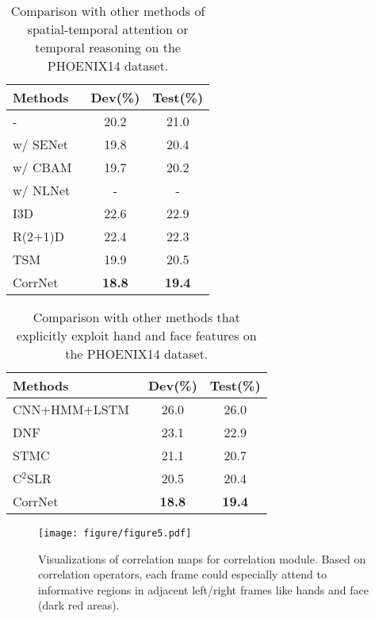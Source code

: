 \documentclass[10pt,twocolumn,letterpaper]{article}
\begin{document}
  \begin{table}[t]   
  \centering
  \setlength\tabcolsep{3pt}
  \begin{tabular}{lcc}
  \hline
  Methods & Dev(\%) & Test(\%)\\
  \hline
  - & 20.2 & 21.0\\
  w/ SENet~\cite{hu2018squeeze}  & 19.8  & 20.4 \\
  w/ CBAM~\cite{woo2018cbam} & 19.7 & 20.2 \\
  w/ NLNet~\cite{wang2018non} & - & -\\
  \hline
  I3D~\cite{carreira2017quo} & 22.6  & 22.9 \\
  R(2+1)D~\cite{tran2018closer}  & 22.4  & 22.3 \\
  TSM~\cite{lin2019tsm} & 19.9 & 20.5 \\
  \hline
  CorrNet & \textbf{18.8} & \textbf{19.4} \\
  \hline
  \end{tabular}
  \caption{Comparison with other methods of spatial-temporal attention or temporal reasoning on the PHOENIX14 dataset.} 
  \label{tab6} 
  \end{table}

\begin{table}[t]   
  \centering
  \setlength\tabcolsep{3pt}
  \begin{tabular}{lcc}
  \hline
  Methods & Dev(\%) & Test(\%)\\
  \hline
  CNN+HMM+LSTM~\cite{koller2019weakly} & 26.0  & 26.0 \\
  DNF~\cite{cui2019deep} & 23.1 & 22.9\\
  STMC~\cite{zhou2020spatial} & 21.1  & 20.7 \\
  C$^2$SLR~\cite{zuo2022c2slr} & 20.5  & 20.4 \\
  \hline
  CorrNet & \textbf{18.8} & \textbf{19.4} \\
  \hline
  \end{tabular}
  \caption{Comparison with other methods that explicitly exploit hand and face features on the PHOENIX14 dataset.} 
  \label{tab7} 
  \end{table}

\begin{figure*}[t]
  \centering
  \texttt{[image: figure/figure5.pdf]}
  \caption{Visualizations of correlation maps for correlation module. Based on correlation operators, each frame could especially attend to informative regions in adjacent left/right frames like hands and face (dark red areas).}
  \label{fig4}
  \end{figure*}  
\end{document}
